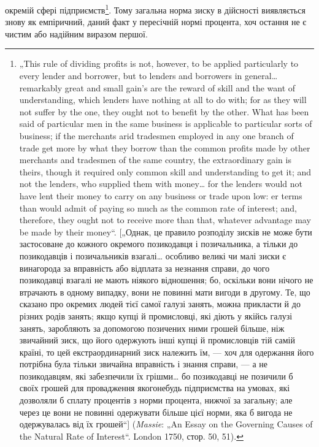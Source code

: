 \parcont{}  %
окремій сфері підприємств\footnote{
„This rule of dividing profits is not, however, to be applied particularly to
every lender and borrower, but to lenders and borrowers in general\dots{} remarkably
great and small gain's are the reward of skill and the want of understanding, which
lenders have nothing at all to do with; for as they will not suffer by the one,
they ought not to benefit by the other. What has been said of particular men in
the same business is applicable to particular sorts of business; if the merchants
arid tradesmen employed in any one branch of trade get more by what they borrow
than the common profits made by other merchants and tradesmen of the same
country, the extraordinary gain is theirs, though it required only common skill
and understanding to get it; and not the lenders, who supplied them with money\dots{}
for the lenders would not have lent their money to carry on any business or trade
upon low: er terms than would admit of paying so much as the common rate of
interest; and, therefore, they ought not to receive more than that, whatever advantage
may be made by their money“. [„Однак, це правило розподілу зисків не
може бути застосоване до кожного окремого позикодавця і позичальника, а
тільки до позикодавців і позичальників взагалі\dots{} особливо великі чи малі зиски
є винагорода за вправність або відплата за незнання справи, до чого позикодавці
взагалі не мають ніякого відношення; бо, оскільки вони нічого не втрачають
в одному випадку, вони не повинні мати вигоди в другому. Те, що сказано
про окремих людей тієї самої галузі занять, можна прикласти й до різних
родів занять; якщо купці й промисловці, які діють у якійсь галузі занять, заробляють
за допомогою позичених ними грошей більше, ніж звичайний зиск,
що його одержують інші купці й промисловців тій самій країні, то цей екстраординарний
зиск належить їм, — хоч для одержання його потрібна була тільки
звичайна вправність і знання справи, — а не позикодавцям, які забезпечили
їх грішми\dots{} бо позикодавці не позичили б своїх грошей для провадження якогонебудь
підприємства на умовах, які дозволяли б сплату процентів з норми
процента, нижчої за загальну; але через це вони не повинні одержувати більше
цієї норми, яка б вигода не одержувалась від їх грошей“] (\emph{Massie}: „An
Essay on the Governing Causes of the Natural Rate of Interest“. London 1750,
стор. 50, 51).
}. Тому загальна норма зиску в дійсності
виявляється знову як емпіричний, даний факт у пересічній
нормі процента, хоч остання не є чистим або надійним виразом
першої.

